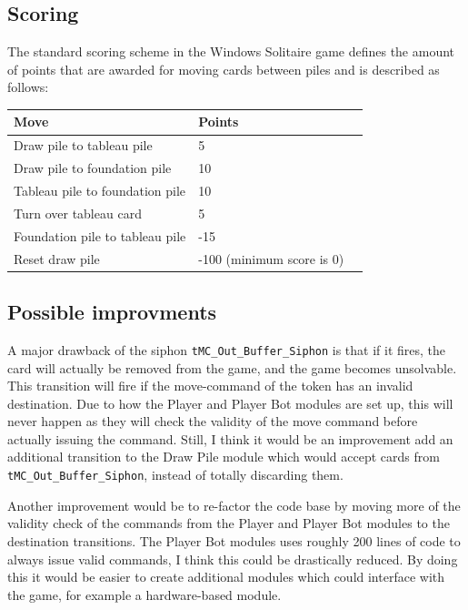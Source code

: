 \documentclass[runningheads,a4paper]{llncs}
\begin{document}
\subsection{Scoring}
The standard scoring scheme in the Windows Solitaire game defines the amount of points that are awarded for moving cards between piles and is described as follows:
\begin{center}
	\begin{tabular}{ | l | l | l | }
		\hline
		Move & Points \\ \hline
		Draw pile to tableau pile & 5  \\ \hline
		Draw pile to foundation pile & 10 \\ \hline
		Tableau pile to foundation pile & 10  \\ \hline
		Turn over tableau card & 5 \\ \hline
		Foundation pile to tableau pile & -15 \\ \hline
		Reset draw pile & -100 (minimum score is 0) \\ \hline
	\end{tabular}
\end{center}
\subsection{Possible improvments}
A major drawback of the siphon \verb!tMC_Out_Buffer_Siphon! is that if it fires, the card will actually be removed from the game, and the game becomes unsolvable. This transition will fire if the move-command of the token has an invalid destination. Due to how the Player and Player Bot modules are set up, this will never happen as they will check the validity of the move command before actually issuing the command. Still, I think it would be an improvement add an additional transition to the Draw Pile module which would accept cards from \verb!tMC_Out_Buffer_Siphon!, instead of totally discarding them.
\newline

Another improvement would be to re-factor the code base by moving more of the validity check of the commands from the Player and Player Bot modules to the destination transitions. The Player Bot modules uses roughly 200 lines of code to always issue valid commands, I think this could be drastically reduced. By doing this it would be easier to create additional modules which could interface with the game, for example a hardware-based module.
\newline
\end{document}
